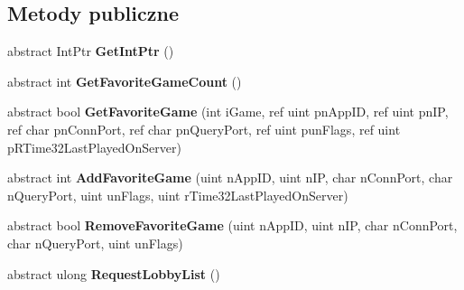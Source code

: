 \subsection*{Metody publiczne}
\begin{DoxyCompactItemize}
\item 
\mbox{\label{class_valve_1_1_steamworks_1_1_i_steam_matchmaking_a1b10a8497ff482326048828354633f03}} 
abstract Int\+Ptr {\bfseries Get\+Int\+Ptr} ()
\item 
\mbox{\label{class_valve_1_1_steamworks_1_1_i_steam_matchmaking_aa2c7b2884617c61ad02ded321d7b62e1}} 
abstract int {\bfseries Get\+Favorite\+Game\+Count} ()
\item 
\mbox{\label{class_valve_1_1_steamworks_1_1_i_steam_matchmaking_a9bb901ec55d3d053ec1b45f325445802}} 
abstract bool {\bfseries Get\+Favorite\+Game} (int i\+Game, ref uint pn\+App\+ID, ref uint pn\+IP, ref char pn\+Conn\+Port, ref char pn\+Query\+Port, ref uint pun\+Flags, ref uint p\+R\+Time32\+Last\+Played\+On\+Server)
\item 
\mbox{\label{class_valve_1_1_steamworks_1_1_i_steam_matchmaking_a771af0c2d597fd008f06a7d9eb0ab5f4}} 
abstract int {\bfseries Add\+Favorite\+Game} (uint n\+App\+ID, uint n\+IP, char n\+Conn\+Port, char n\+Query\+Port, uint un\+Flags, uint r\+Time32\+Last\+Played\+On\+Server)
\item 
\mbox{\label{class_valve_1_1_steamworks_1_1_i_steam_matchmaking_a0f339f13e108fbed2239487fbe680b86}} 
abstract bool {\bfseries Remove\+Favorite\+Game} (uint n\+App\+ID, uint n\+IP, char n\+Conn\+Port, char n\+Query\+Port, uint un\+Flags)
\item 
\mbox{\label{class_valve_1_1_steamworks_1_1_i_steam_matchmaking_a75e3bbd72148a817b2c644970ac66c5d}} 
abstract ulong {\bfseries Request\+Lobby\+List} ()
\item 
\mbox{\label{class_valve_1_1_steamworks_1_1_i_steam_matchmaking_a7c1bed67d911ea47b6d8b410b2e36f19}} 

\end{DoxyCompactItemize}
